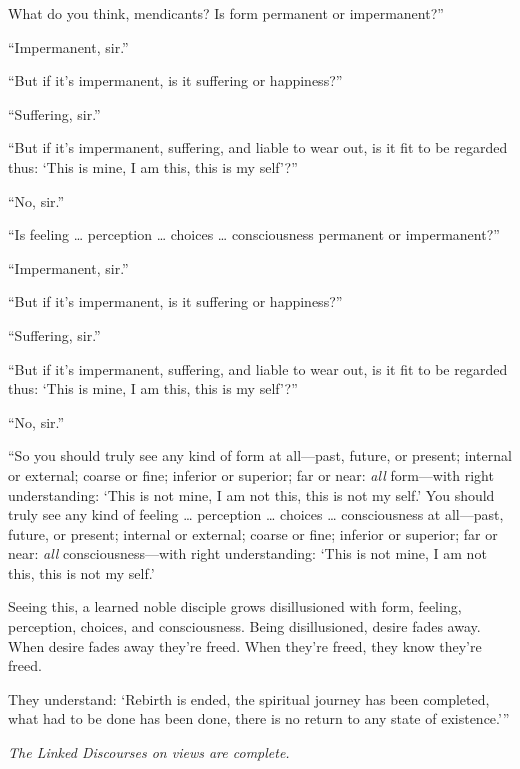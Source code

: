 \documentclass[12pt,openany]{book}%
\let\oldcontentsline\contentsline
\newcommand{\nopagecontentsline}[3]{\oldcontentsline{#1}{#2}{}}
\newcommand*{\scendsutta}[1]{\begin{center}\textit{#1}\end{center}}
\begin{document}
What do you think, mendicants? Is form permanent or impermanent?” 

“Impermanent, sir.” 

“But if it’s impermanent, is it suffering or happiness?” 

“Suffering, sir.” 

“But if it’s impermanent, suffering, and liable to wear out, is it fit to be regarded thus: ‘This is mine, I am this, this is my self’?” 

“No, sir.” 

“Is feeling … perception … choices … consciousness permanent or impermanent?” 

“Impermanent, sir.” 

“But if it’s impermanent, is it suffering or happiness?” 

“Suffering, sir.” 

“But if it’s impermanent, suffering, and liable to wear out, is it fit to be regarded thus: ‘This is mine, I am this, this is my self’?” 

“No, sir.” 

“So you should truly see any kind of form at all—past, future, or present; internal or external; coarse or fine; inferior or superior; far or near: \emph{all} form—with right understanding: ‘This is not mine, I am not this, this is not my self.’ You should truly see any kind of feeling … perception … choices … consciousness at all—past, future, or present; internal or external; coarse or fine; inferior or superior; far or near: \emph{all} consciousness—with right understanding: ‘This is not mine, I am not this, this is not my self.’ 

Seeing this, a learned noble disciple grows disillusioned with form, feeling, perception, choices, and consciousness. Being disillusioned, desire fades away. When desire fades away they’re freed. When they’re freed, they know they’re freed. 

They understand: ‘Rebirth is ended, the spiritual journey has been completed, what had to be done has been done, there is no return to any state of existence.’” 

\scendsutta{The Linked Discourses on views are complete. }

%
\end{document}
